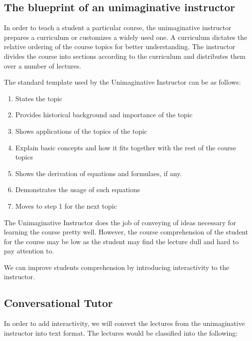 \documentclass[]{article}
\begin{document}
\subsection[Instructor Model]{The blueprint of an unimaginative instructor} 

In order to teach a student a particular course, the unimaginative instructor prepares a curriculum or customizes a widely used one. A curriculum dictates the relative ordering of the course topics for better understanding. The instructor divides the course into sections according to the curriculum  and distributes them over a number of lectures.

The standard template used by the Unimaginative Instructor can be as follows:
\begin{enumerate}
  \item States the topic
  \item Provides historical background and importance of the topic
  \item Shows applications of the topics of the topic
  \item Explain basic concepts and how it fits together with the rest of the course topics  
  \item Shows the derivation of equations and formulaes, if any.
  \item Demonstrates the usage of such equations
  \item Moves to step 1 for the next topic
  \end{enumerate}

The Unimaginative Instructor does the job of conveying of ideas necessary for learning the course pretty well. However, the course comprehension of the student for the course may be low as the student may find the lecture dull and hard to pay attention to.

We can improve students comprehension by introducing interactivity to the instructor. 

\subsection[Conversational Tutor]{Conversational Tutor}


In order to add interactivity, we will convert the lectures from the unimaginative instructor into text format. The lectures would be classified into the following:
\end{document}

